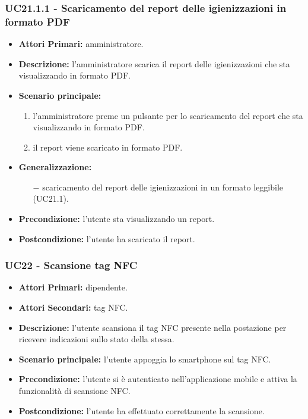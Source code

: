 \subsubsection{ UC21.1.1 - Scaricamento del report delle igienizzazioni in formato PDF}
\begin{itemize}
	\item\textbf{Attori Primari:} 
	amministratore.
	\item\textbf{Descrizione:} 
	l'amministratore scarica il report delle igienizzazioni che sta visualizzando in formato PDF.
	\item\textbf{Scenario principale:} 
	\begin{enumerate}
		\item l'amministratore preme un pulsante per lo scaricamento del report che sta visualizzando in formato PDF.
		\item il report viene scaricato in formato PDF.
	\end{enumerate}
	\item\textbf{Generalizzazione:}
	\begin{itemize}
		\item[$-$] scaricamento del report delle igienizzazioni in un formato leggibile (UC21.1).
	\end{itemize}
	\item\textbf{Precondizione:} 
	l'utente sta visualizzando un report.
	\item\textbf{Postcondizione:}
	l'utente ha scaricato il report.
\end{itemize}

\subsubsection{ UC22 - Scansione tag NFC}
\begin{itemize}
	\item\textbf{Attori Primari:} dipendente.
	\item\textbf{Attori Secondari:} tag NFC.
	\item\textbf{Descrizione:} l’utente scansiona il tag NFC presente nella postazione per ricevere indicazioni sullo stato della stessa.
	\item\textbf{Scenario principale:} l’utente appoggia lo smartphone sul tag NFC.
	\item\textbf{Precondizione:} l’utente si è autenticato nell'applicazione mobile e attiva la funzionalità di scansione NFC.
	\item\textbf{Postcondizione:} l’utente ha effettuato correttamente la scansione.
\end{itemize}

